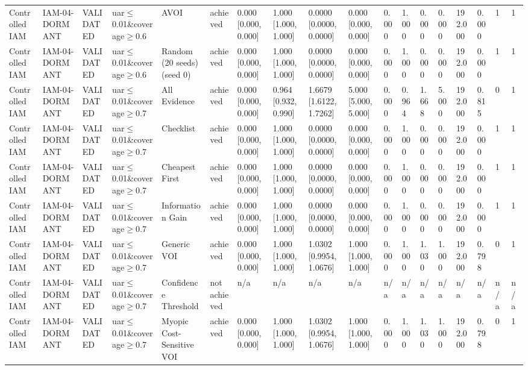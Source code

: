 \begin{table}[!ht]
{\begin{tabular}{llllllllllllllllll}
Controlled IAM & IAM-04-DORMANT & VALIDATED & uar$\le$0.01\&coverage$\ge$0.6 & AVOI & achieved & 0.000 [0.000, 0.000] & 1.000 [1.000, 1.000] & 0.0000 [0.0000, 0.0000] & 0.000 [0.000, 0.000] & 0.000 & 1.000 & 0.000 & 0.000 & 192.000 & 0.000 & 1 & 1 \\
Controlled IAM & IAM-04-DORMANT & VALIDATED & uar$\le$0.01\&coverage$\ge$0.6 & Random (20 seeds) (seed 0) & achieved & 0.000 [0.000, 0.000] & 1.000 [1.000, 1.000] & 0.0000 [0.0000, 0.0000] & 0.000 [0.000, 0.000] & 0.000 & 1.000 & 0.000 & 0.000 & 192.000 & 0.000 & 1 & 1 \\
Controlled IAM & IAM-04-DORMANT & VALIDATED & uar$\le$0.01\&coverage$\ge$0.7 & All Evidence & achieved & 0.000 [0.000, 0.000] & 0.964 [0.932, 0.990] & 1.6679 [1.6122, 1.7262] & 5.000 [5.000, 5.000] & 0.000 & 0.964 & 1.668 & 5.000 & 192.000 & 0.815 & 0 & 1 \\
Controlled IAM & IAM-04-DORMANT & VALIDATED & uar$\le$0.01\&coverage$\ge$0.7 & Checklist & achieved & 0.000 [0.000, 0.000] & 1.000 [1.000, 1.000] & 0.0000 [0.0000, 0.0000] & 0.000 [0.000, 0.000] & 0.000 & 1.000 & 0.000 & 0.000 & 192.000 & 0.000 & 1 & 1 \\
Controlled IAM & IAM-04-DORMANT & VALIDATED & uar$\le$0.01\&coverage$\ge$0.7 & Cheapest First & achieved & 0.000 [0.000, 0.000] & 1.000 [1.000, 1.000] & 0.0000 [0.0000, 0.0000] & 0.000 [0.000, 0.000] & 0.000 & 1.000 & 0.000 & 0.000 & 192.000 & 0.000 & 1 & 1 \\
Controlled IAM & IAM-04-DORMANT & VALIDATED & uar$\le$0.01\&coverage$\ge$0.7 & Information Gain & achieved & 0.000 [0.000, 0.000] & 1.000 [1.000, 1.000] & 0.0000 [0.0000, 0.0000] & 0.000 [0.000, 0.000] & 0.000 & 1.000 & 0.000 & 0.000 & 192.000 & 0.000 & 1 & 1 \\
Controlled IAM & IAM-04-DORMANT & VALIDATED & uar$\le$0.01\&coverage$\ge$0.7 & Generic VOI & achieved & 0.000 [0.000, 0.000] & 1.000 [1.000, 1.000] & 1.0302 [0.9954, 1.0676] & 1.000 [1.000, 1.000] & 0.000 & 1.000 & 1.030 & 1.000 & 192.000 & 0.798 & 0 & 1 \\
Controlled IAM & IAM-04-DORMANT & VALIDATED & uar$\le$0.01\&coverage$\ge$0.7 & Confidence Threshold & not achieved & n/a & n/a & n/a & n/a & n/a & n/a & n/a & n/a & n/a & n/a & n/a & n/a \\
Controlled IAM & IAM-04-DORMANT & VALIDATED & uar$\le$0.01\&coverage$\ge$0.7 & Myopic Cost-Sensitive VOI & achieved & 0.000 [0.000, 0.000] & 1.000 [1.000, 1.000] & 1.0302 [0.9954, 1.0676] & 1.000 [1.000, 1.000] & 0.000 & 1.000 & 1.030 & 1.000 & 192.000 & 0.798 & 0 & 1 \\

\end{tabular}}
\end{table}

